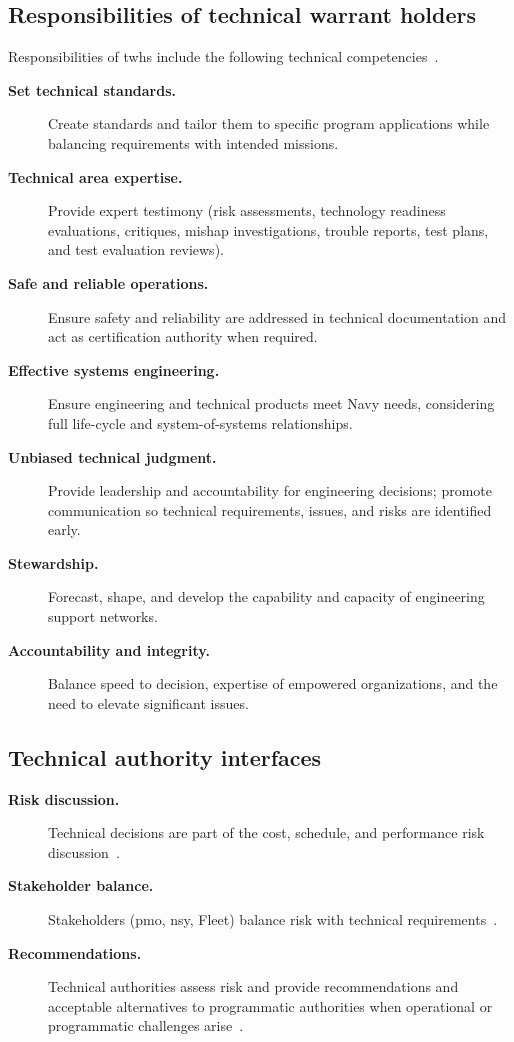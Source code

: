 \documentclass[../main.tex]{subfiles}
\begin{document}
\subsection{Responsibilities of technical warrant holders}
Responsibilities of \acp{twh} include the following technical competencies~\autocite{edo-2-1-5-technical-authority-2025}.
\begin{description}
  \item[\textbf{Set technical standards.}] Create standards and tailor them to specific program applications while balancing requirements with intended missions.
  \item[\textbf{Technical area expertise.}] Provide expert testimony (risk assessments, technology readiness evaluations, critiques, mishap investigations, trouble reports, test plans, and test evaluation reviews).
  \item[\textbf{Safe and reliable operations.}] Ensure safety and reliability are addressed in technical documentation and act as certification authority when required.
  \item[\textbf{Effective systems engineering.}] Ensure engineering and technical products meet Navy needs, considering full life-cycle and system-of-systems relationships.
  \item[\textbf{Unbiased technical judgment.}] Provide leadership and accountability for engineering decisions; promote communication so technical requirements, issues, and risks are identified early.
  \item[\textbf{Stewardship.}] Forecast, shape, and develop the capability and capacity of engineering support networks.
  \item[\textbf{Accountability and integrity.}] Balance speed to decision, expertise of empowered organizations, and the need to elevate significant issues.
\end{description}

\subsection{Technical authority interfaces}
\begin{description}
  \item[\textbf{Risk discussion.}] Technical decisions are part of the cost, schedule, and performance risk discussion~\autocite{edo-2-1-5-technical-authority-2025}.
  \item[\textbf{Stakeholder balance.}] Stakeholders (\ac{pmo}, \ac{nsy}, Fleet) balance risk with technical requirements~\autocite{edo-2-1-5-technical-authority-2025}.
  \item[\textbf{Recommendations.}] Technical authorities assess risk and provide recommendations and acceptable alternatives to programmatic authorities when operational or programmatic challenges arise~\autocite{edo-2-1-5-technical-authority-2025}.
\end{description}
\end{document}
